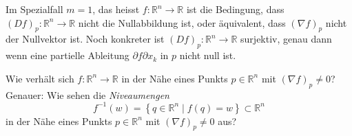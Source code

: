 \documentclass[../main.tex]{subfiles}
\begin{document}
Im Spezialfall $m = 1$, das heisst $f \colon \mathbb{R}^n \to \mathbb{R}$ 
ist die Bedingung, dass ${(Df)}_p \colon \mathbb{R}^n \to \mathbb{R}$
nicht die Nullabbildung ist, oder äquivalent, dass
${(\nabla f)}_p$ nicht der Nullvektor ist.
Noch konkreter ist $({Df})_p \colon \mathbb{R}^n \to \mathbb{R}$
surjektiv, genau dann wenn eine partielle Ableitung $\partial f \partial x_k$
in $p$ nicht null ist.

\begin{question}
  Wie verhält sich $f \colon \mathbb{R}^n \to \mathbb{R}$ 
  in der Nähe eines Punkts $p \in \mathbb{R}^n$ mit
  ${(\nabla f)}_p \neq 0$? Genauer: Wie sehen die 
  \emph{Niveaumengen}
  \[
    f^{-1}(w) = \left\{q \in \mathbb{R}^n \mid f(q) = w\right\}
    \subset \mathbb{R}^n
  \]
  in der Nähe eines Punkts $p \in \mathbb{R}^n$ 
  mit ${(\nabla f)}_p \neq 0$ aus?
\end{question}
\end{document}
